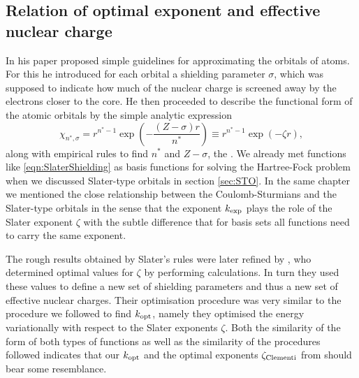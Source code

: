 %
%
\subsection{Relation of optimal exponent and effective nuclear charge}
\label{sec:ValuesKopt}

In his \citeyear{Slater1930} paper \citet{Slater1930} proposed simple guidelines
for approximating the orbitals of atoms.
For this he introduced for each orbital a shielding parameter $\sigma$,
which was supposed to indicate how much of the nuclear charge is screened
away by the electrons closer to the core.
He then proceeded to describe the functional
form of the atomic orbitals by the simple analytic expression
\begin{equation}
	\chi_{n^\ast, \sigma} = r^{n^\ast - 1} \exp\left( - \frac{(Z - \sigma)r}{n^\ast} \right)
	\equiv r^{n^\ast - 1} \exp\left( -\zeta r\right),
	\label{eqn:SlaterShielding}
\end{equation}
along with empirical rules to find $n^\ast$ and $Z - \sigma$,
the .
We already met functions like \eqref{eqn:SlaterShielding}
as basis functions for solving the Hartree-Fock problem
when we discussed Slater-type orbitals in section \vref{sec:STO}.
In the same chapter we mentioned the close relationship between
the Coulomb-Sturmians and the Slater-type orbitals
in the sense that the \CS exponent $k_\text{exp}$
plays the role of the Slater exponent $\zeta$
with the subtle difference that for \CS basis sets all functions
need to carry the same exponent.

\newcommand{\zCl}{\ensuremath \zeta_\text{Clementi}}
The rough results obtained by Slater's rules
were later refined by \citet{Clementi1963},
who determined optimal values for $\zeta$ by performing \HF calculations.
In turn they used these values to define a new set of shielding parameters
and thus a new set of effective nuclear charges.
Their optimisation procedure was very similar to the procedure
we followed to find $k_\text{opt}$,
namely they optimised the energy variationally with respect to the
Slater exponents $\zeta$.
Both the similarity of the form of both types
of functions as well as the similarity of the procedures followed
indicates that our $k_\text{opt}$ and the optimal exponents $\zCl$ from
\citeauthor{Clementi1963} should bear some resemblance.

